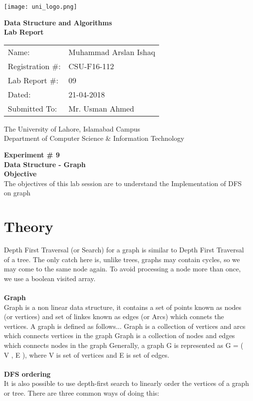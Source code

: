 \documentclass[11pt]{article}            %
\begin{document}
\begin{titlepage}
    \centering
  \vfill
    \texttt{[image: uni\_logo.png]} \\ 
	\vskip2cm
    {\bfseries\Large
	Data Structure and Algorithms \\ 
	
	\vskip2cm
	Lab Report 
	 
	\vskip2cm
	}    

\begin{center}
\begin{tabular}{ l l  } 

Name: & Muhammad Arslan Ishaq \\ 
Registration \#: & CSU-F16-112 \\ 
Lab Report \#: & 09 \\ 
 Dated:& 21-04-2018\\ 
Submitted To:& Mr. Usman Ahmed\\ 

\end{tabular}
\end{center}
    \vfill
    The University of Lahore, Islamabad Campus\\
Department of Computer Science \& Information Technology
\end{titlepage}


    
    {\bfseries\Large
\centering
	Experiment \# 9 \\

Data Structure - Graph \\
		}    
 \vskip1cm
 \textbf {Objective}\\  The objectives of this lab session are to understand the Implementation of DFS on graph



\section{Theory }              
Depth First Traversal (or Search) for a graph is similar to Depth First Traversal of a tree. The only catch here is, unlike trees, graphs may contain cycles, so we may come to the same node again. To avoid processing a node more than once, we use a boolean visited array. \\  \\
\textbf{Graph}\\ 
Graph is a non linear data structure, it contains a set of points known as nodes (or vertices) and set of linkes known as edges (or Arcs) which connets the vertices. A graph is defined as follows...
Graph is a collection of vertices and arcs which connects vertices in the graph
Graph is a collection of nodes and edges which connects nodes in the graph
Generally, a graph G is represented as G = ( V , E ), where V is set of vertices and E is set of edges.
  \\ \\
\textbf{DFS ordering }\\
It is also possible to use depth-first search to linearly order the vertices of a graph or tree. There are three common ways of doing this:
\end{document}
